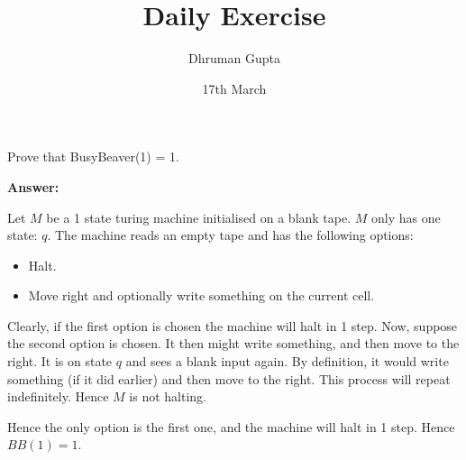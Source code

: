 \documentclass[11pt]{article}
\title{Daily Exercise}
\author{Dhruman Gupta}
\date{17th March}
\begin{document}

Prove that BusyBeaver(1) = 1.

\textbf{Answer:}

Let $M$ be a 1 state turing machine initialised on a blank tape. $M$ only has one state: $q$. The machine reads an empty tape and has the following options:

\begin{itemize}
    \item Halt.
    \item Move right and optionally write something on the current cell.
\end{itemize}

Clearly, if the first option is chosen the machine will halt in 1 step. Now, suppose the second option is chosen. It then might write something, and then move to the right. It is on state $q$ and sees a blank input again. By definition, it would write something (if it did earlier) and then move to the right. This process will repeat indefinitely. Hence $M$ is not halting.

Hence the only option is the first one, and the machine will halt in 1 step. Hence $BB(1) = 1$.
\end{document}

